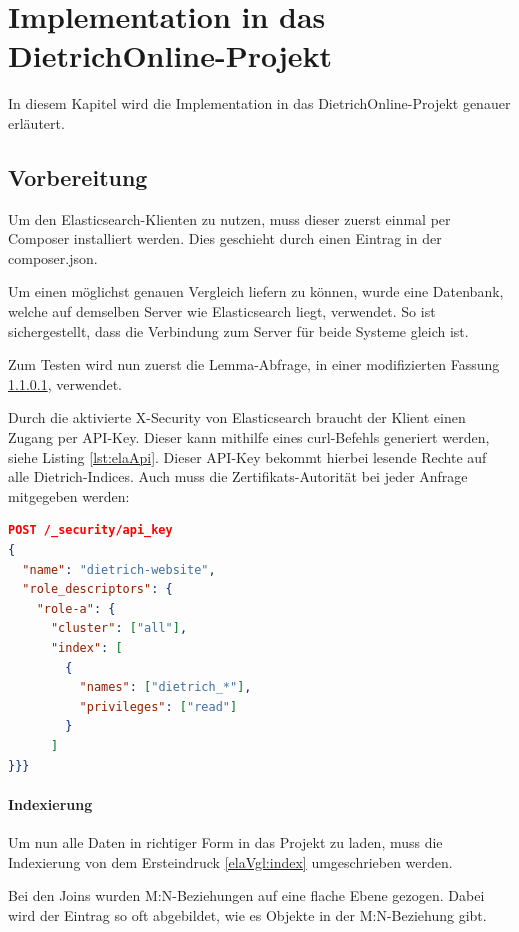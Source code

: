\chapter{Implementation in das DietrichOnline-Projekt}

In diesem Kapitel wird die Implementation in das DietrichOnline-Projekt genauer erläutert.

\section{Vorbereitung}

Um den Elasticsearch-Klienten zu nutzen, muss dieser zuerst einmal per Composer installiert werden. Dies geschieht durch einen Eintrag in der composer.json.

Um einen möglichst genauen Vergleich liefern zu können, wurde eine Datenbank, welche auf demselben Server wie Elasticsearch liegt, verwendet. So ist sichergestellt, dass die Verbindung zum Server für beide Systeme gleich ist.

Zum Testen wird nun zuerst die Lemma-Abfrage, in einer modifizierten Fassung \ref{lemmaIndexierungEla}, verwendet.

Durch die aktivierte X-Security von Elasticsearch braucht der Klient einen Zugang per API-Key. Dieser kann mithilfe eines curl-Befehls generiert werden, siehe Listing \ref{lst:elaApi}. Dieser API-Key bekommt hierbei lesende Rechte auf alle Dietrich-Indices. Auch muss die Zertifikats-Autorität bei jeder Anfrage mitgegeben werden:

\begin{lstlisting}[language=JSON, frame=single, label={lst:elaApi}, caption=Code zur Generierung eines API-Keys,captionpos=b] 
POST /_security/api_key
{
  "name": "dietrich-website",
  "role_descriptors": { 
    "role-a": {
      "cluster": ["all"],
      "index": [
        {
          "names": ["dietrich_*"],
          "privileges": ["read"]
        }
      ]
}}}
\end{lstlisting}


\subsubsection{Indexierung}
\label{lemmaIndexierungEla}

Um nun alle Daten in richtiger Form in das Projekt zu laden, muss die Indexierung von dem Ersteindruck \ref{elaVgl:index} umgeschrieben werden. 

Bei den Joins wurden M:N-Beziehungen auf eine flache Ebene gezogen. Dabei wird der Eintrag so oft abgebildet, wie es Objekte in der M:N-Beziehung gibt. 

